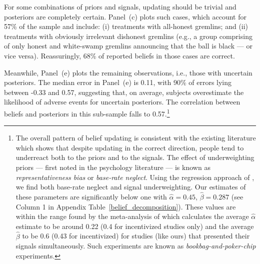 \documentclass[12pt,a4paper]{article}
\begin{document}
For some combinations of priors and signals, updating should be trivial and posteriors are completely certain.  
Panel~(c) plots such cases, which account for 57\% of the sample and include: (i) treatments with all-honest gremlins; and (ii) treatments with obviously irrelevant dishonest gremlins (e.g., a group comprising of only honest and white-swamp gremlins announcing that the ball is black --- or vice versa). Reassuringly, 68\% of reported beliefs in those cases are correct.

Meanwhile, Panel~(e) plots the remaining observations, i.e., those with uncertain posteriors. The median error in Panel~(e) is 0.11, with 90\% of errors lying between -0.33 and 0.57, suggesting that, on average, subjects overestimate the likelihood of adverse events for uncertain posteriors. The correlation between beliefs and posteriors in this sub-sample falls to 0.57.\footnote{The overall pattern of belief updating is consistent with the existing literature which shows that despite updating in the correct direction, people tend to underreact both to the priors and to the signals. The effect of underweighting priors --- first noted in the psychology literature \citep{phillips_conservatism_1966-1, tversky_belief_1971, kahneman_subjective_1972} --- is known as \emph{representativeness bias} or \emph{base-rate neglect}. Using the regression approach of \citet{grether_bayes_1980}, we find both base-rate neglect and signal underweighting. Our estimates of these parameters are significantly below one with $\hat \alpha=0.45$, $\hat \beta=0.287$ (see Column 1 in Appendix Table~\ref{belief_decomposition}). These values are within the range found by the meta-analysis of \citet{benjamin_chapter_2019} which calculates the average $\hat \alpha$ estimate to be around 0.22 (0.4 for incentivized studies only) and the average $\hat \beta$ to be 0.6 (0.43 for incentivized) for studies (like ours) that presented their signals simultaneously.  Such experiments are known as \emph{bookbag-and-poker-chip} experiments.} 

\end{document}
